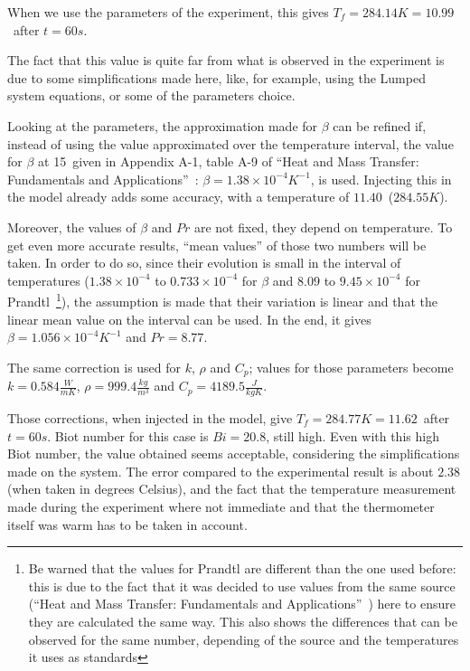 \documentclass{report}
\begin{document}
	When we use the parameters of the experiment, this gives $T_f=284.14K=10.99$\textcelsius\ after $t=60s$.
	
	The fact that this value is quite far from what is observed in the experiment is due to some simplifications made here, like, for example, using the Lumped system equations, or some of the parameters choice.
	
	Looking at the parameters, the approximation made for $\beta$ can be refined if, instead of using the value approximated over the temperature interval, the value for $\beta$ at 15\textcelsius\ given in Appendix A-1, table A-9 of ``Heat and Mass Transfer: Fundamentals and Applications''~\cite{HaMT}: $\beta=1.38\times 10^{-4} K^{-1}$, is used. Injecting this in the model already adds some accuracy, with a temperature of $11.40$\textcelsius\ ($284.55K$).
	
	Moreover, the values of $\beta$ and $Pr$ are not fixed, they depend on temperature. To get even more accurate results, ``mean values'' of those two numbers will be taken. In order to do so, since their evolution is small in the interval of temperatures ($1.38\times 10^{-4}$ to $0.733\times 10^{-4}$ for $\beta$ and $8.09$ to $9.45\times 10^{-4}$ for Prandtl~\footnote{Be warned that the values for Prandtl are different than the one used before: this is due to the fact that it was decided to use values from the same source (``Heat and Mass Transfer: Fundamentals and Applications''~\cite{HaMT}) here to ensure they are calculated the same way. This also shows the differences that can be observed for the same number, depending of the source and the temperatures it uses as standards}), the assumption is made that their variation is linear and that the linear mean value on the interval can be used. In the end, it gives $\beta=1.056\times 10^{-4} K^{-1}$ and $Pr=8.77$.
	
	The same correction is used for $k$, $\rho$ and $C_p$; values for those parameters become $k=0.584\frac{W}{mK}$, $\rho=999.4\frac{kg}{m^3}$ and $C_p=4189.5\frac{J}{kgK}$.
	
	Those corrections, when injected in the model, give $T_f=284.77K=11.62$\textcelsius\ after $t=60s$. Biot number for this case is $Bi=20.8$, still high. Even with this high Biot number, the value obtained seems acceptable, considering the simplifications made on the system. The error compared to the experimental result is about $2.38$\textdiscount (when taken in degrees Celsius), and the fact that the temperature measurement made during the experiment where not immediate and that the thermometer itself was warm has to be taken in account.
	
\end{document}
